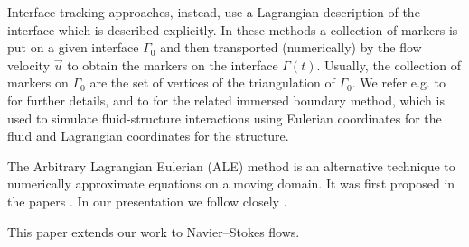 \documentclass[a4paper,12pt,onecolumn]{article}
\begin{document}
Interface tracking approaches, instead, use a Lagrangian description of the
interface which is described explicitly. In these methods a collection of
markers is put on a given interface $\Gamma_0$ and then transported
(numerically) by the flow velocity $\vec u$ to obtain the markers on the
interface $\Gamma(t)$. Usually, the collection of markers on $\Gamma_0$ are the
set of vertices of the triangulation of $\Gamma_0$. We refer e.g. to
\cite{UnverdiT92,Bansch01,Tryggvason_etal01,GanesanMT07,GanesanT08,spurious,
fluidfbp} for further details, and to \cite{LevequeL97,Peskin02} for the
related immersed boundary method, which is used to simulate fluid-structure
interactions using Eulerian coordinates for the fluid and Lagrangian
coordinates for the structure.

The Arbitrary Lagrangian Eulerian (ALE) method is an alternative technique to
numerically approximate equations on a moving domain. It was first proposed in
the papers \cite{Donea83,Hughes81}. In our presentation we follow closely
\cite{Nobile99,Formaggia04,NobilePhd}.

This paper extends our work \cite{stokesfitted} to Navier--Stokes flows.
\end{document}

